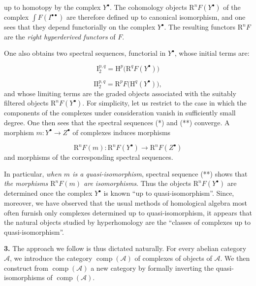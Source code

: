 %
up to homotopy by the complex $Y^{\bullet}$. The cohomology objects
$\mathrm R^nF(Y^{\bullet})$ of the complex
$\int F(I^{\bullet\bullet})$ are therefore defined up to canonical
isomorphism, and one sees that they depend functorially on the complex
$Y^{\bullet}$. The resulting functors $\mathrm R^nF$ are the
\emph{right hyperderived functors} of $F$.

One also obtains two spectral sequences, functorial in $Y^{\bullet}$, whose
initial terms are:

\begin{equation}
\mathrm I_2^{p,q}=\mathrm H^p\bigl(\mathrm R^qF(Y^{\bullet})\bigr)
\tag{*}
\end{equation}

\begin{equation}
\mathrm{II}_2^{p,q}=\mathrm R^pF\bigl(\mathrm H^q(Y^{\bullet})\bigr),
\tag{**}
\end{equation}
and whose limiting terms are the graded objects associated with the suitably
filtered objects $\mathrm R^nF(Y^{\bullet})$. For simplicity, let us restrict
to the case in which the components of the complexes under consideration
vanish in sufficiently small degree. One then sees that the spectral
sequences (*) and (**) converge. A morphism
$m:Y^{\bullet}\to Z^{\bullet}$ of complexes induces morphisms

\[
\mathrm R^nF(m):\mathrm R^nF(Y^{\bullet})
\longrightarrow \mathrm R^nF(Z^{\bullet})
\]
and morphisms of the corresponding spectral sequences.

In particular, \emph{when $m$ is a quasi-isomorphism}, spectral sequence (**)
shows that \emph{the morphisms $\mathrm R^nF(m)$ are isomorphisms}. Thus the
objects $\mathrm R^nF(Y^{\bullet})$ are determined once the complex
$Y^{\bullet}$ is known ``up to quasi-isomorphism''. Since, moreover, we have
observed that the usual methods of homological algebra most often furnish
only complexes determined up to quasi-isomorphism, it appears that the
natural objects studied by hyperhomology are the ``classes of complexes up to
quasi-isomorphism''.

\noindent\textbf{3.}\quad
The approach we follow is thus dictated naturally. For every abelian category
$\mathcal A$, we introduce the category $\operatorname{comp}(\mathcal A)$ of
complexes of objects of $\mathcal A$. We then construct from
$\operatorname{comp}(\mathcal A)$ a new category by formally inverting the
quasi-isomorphisms of $\operatorname{comp}(\mathcal A)$.

